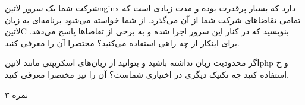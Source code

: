 
شرکت شما یک سرور ‌لاتین{nginx} دارد که بسیار پرقدرت بوده و مدت زیادی است که تمامی تقاضاهای شرکت شما از آن می‌گذرد. از شما خواسته می‌شود برنامه‌ای به زبان ‌لاتین{C} بنویسید که در کنار این سرور اجرا شده و به برخی از تقاضاها پاسخ می‌دهد. برای اینکار از چه راهی استفاده می‌کنید؟ مختصرا آن را معرفی کنید.

اگر محدودیت زبان نداشته باشید و بتوانید از زبان‌های اسکریپتی مانند ‌لاتین{php} و ‌خ استفاده کنید چه تکنیک دیگری در اختیاری شماست؟ آن را نیز مختصرا معرفی کنید.

۳ نمره
